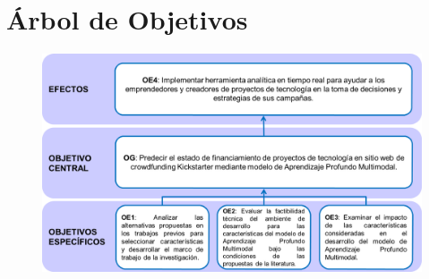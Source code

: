 	\section{Árbol de Objetivos}
	\label{anexo2}
	\begin{figure}[h]
		\begin{center}
			\includegraphics[width=1.05\textwidth]{anexos/arbol_objetivos.png}
		\end{center}
	\end{figure}
	\clearpage
	

